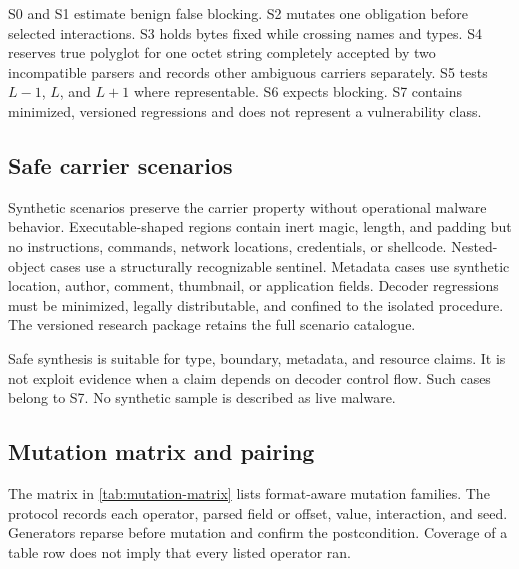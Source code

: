 S0 and S1 estimate benign false blocking. S2 mutates one obligation before
selected interactions. S3 holds bytes fixed while crossing names and types. S4
reserves true polyglot for one octet string completely accepted by two
incompatible parsers and records other ambiguous carriers separately. S5 tests
$L-1$, $L$, and $L+1$ where representable. S6 expects blocking. S7 contains
minimized, versioned regressions and does not represent a vulnerability class.

\subsection{Safe carrier scenarios}
\label{subsec:safe-carriers}

Synthetic scenarios preserve the carrier property without operational malware
behavior. Executable-shaped regions contain inert magic, length, and padding but
no instructions, commands, network locations, credentials, or shellcode.
Nested-object cases use a structurally recognizable sentinel. Metadata cases
use synthetic location, author, comment, thumbnail, or application fields.
Decoder regressions must be minimized, legally distributable, and confined to
the isolated procedure. The versioned research package retains the full
scenario catalogue.

Safe synthesis is suitable for type, boundary, metadata, and resource claims.
It is not exploit evidence when a claim depends on decoder control flow. Such
cases belong to S7. No synthetic sample is described as live malware.

\subsection{Mutation matrix and pairing}
\label{subsec:mutation-matrix}

The matrix in \cref{tab:mutation-matrix} lists format-aware mutation families.
The protocol records each operator, parsed field or offset, value, interaction,
and seed. Generators reparse before mutation and confirm the postcondition.
Coverage of a table row does not imply that every listed operator ran.

